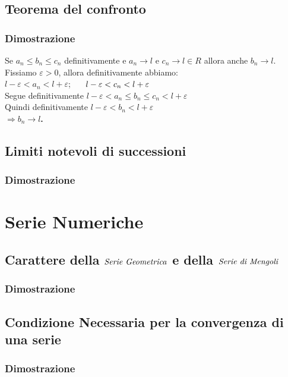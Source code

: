 \documentclass[11pt, a4paper]{article}
\begin{document}
\subsection{Teorema del confronto}
\subsubsection*{Dimostrazione}
Se $a_n \leq b_n \leq c_n$ definitivamente e $a_n \rightarrow l$ e $c_n \rightarrow l \in R$ allora anche $b_n \rightarrow l$.\\
Fissiamo $\varepsilon>0$, allora definitivamente abbiamo: \\$l-\varepsilon<a_n<l+\varepsilon$; $\hspace{0.5cm} l-\varepsilon<c_n<l+\varepsilon$\\ Segue definitivamente $l-\varepsilon<a_n \leq b_n \leq c_n<l+\varepsilon$\\ Quindi definitivamente $l-\varepsilon<b_n<l+\varepsilon$\\
\textbf{$\Longrightarrow b_n\rightarrow l$.}

\subsection{Limiti notevoli di successioni}
\subsubsection*{Dimostrazione}

\newpage

\section{Serie Numeriche}
\subsection{Carattere della $\emph{Serie Geometrica}$ e della $\emph{Serie di Mengoli}$}
\subsubsection*{Dimostrazione}


\subsection{Condizione Necessaria per la convergenza di una serie}
\subsubsection*{Dimostrazione}
\end{document}
